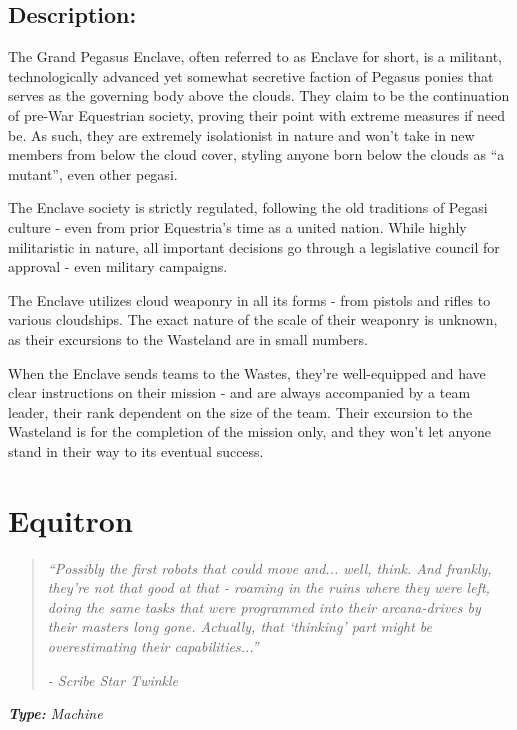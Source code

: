 \documentclass[11pt,a4paper,twocolumn]{book}
\begin{document}
	\subsection*{Description:}
	The Grand Pegasus Enclave, often referred to as Enclave for short, is a militant, technologically advanced yet somewhat secretive faction of Pegasus ponies that serves as the governing body above the clouds. They claim to be the continuation of pre-War Equestrian society, proving their point with extreme measures if need be. As such, they are extremely isolationist in nature and won't take in new members from below the cloud cover, styling anyone born below the clouds as ``a mutant'', even other pegasi. 
	
	The Enclave society is strictly regulated, following the old traditions of Pegasi culture - even from prior Equestria's time as a united nation. While highly militaristic in nature, all important decisions go through a legislative council for approval - even military campaigns.
	
	\bigskip
	The Enclave utilizes cloud weaponry in all its forms - from pistols and rifles to various cloudships. The exact nature of the scale of their weaponry is unknown, as their excursions to the Wasteland are in small numbers. 
	
	When the Enclave sends teams to the Wastes, they're well-equipped and have clear instructions on their mission - and are always accompanied by a team leader, their rank dependent on the size of the team. Their excursion to the Wasteland is for the completion of the mission only, and they won't let anyone stand in their way to its eventual success.
	
	\clearpage
	
	\section*{Equitron}
	\begin{quote}
		\emph{``Possibly the first robots that could move and... well, think. And frankly, they're not that good at that - roaming in the ruins where they were left, doing the same tasks that were programmed into their arcana-drives by their masters long gone. Actually, that `thinking' part might be overestimating their capabilities...''}
		
		\emph{-	Scribe Star Twinkle}
	\end{quote}
	
	\emph{\textbf{Type:} Machine}
	
\end{document}

